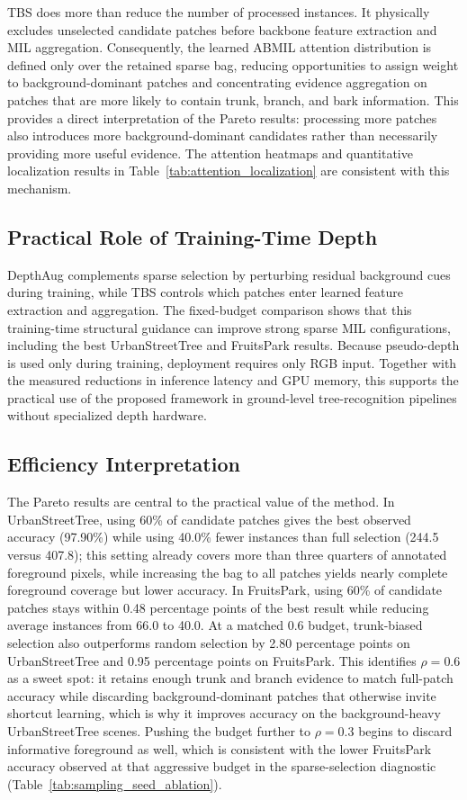 \documentclass{ieeeaccess}
\begin{document}
TBS does more than reduce the number of processed instances. It physically excludes unselected
candidate patches before backbone feature extraction and MIL aggregation. Consequently, the learned
ABMIL attention distribution is defined only over the retained sparse bag, reducing opportunities
to assign weight to background-dominant patches and concentrating evidence aggregation on patches
that are more likely to contain trunk, branch, and bark information. This provides a direct
interpretation of the Pareto results: processing more patches also introduces more
background-dominant candidates rather than necessarily providing more useful evidence. The
attention heatmaps and quantitative localization results in
Table~\ref{tab:attention_localization} are consistent with this mechanism.

\subsection{Practical Role of Training-Time Depth}
DepthAug complements sparse selection by perturbing residual background cues during training, while
TBS controls which patches enter learned feature extraction and aggregation. The fixed-budget
comparison shows that this training-time structural guidance can improve strong sparse MIL
configurations, including the best UrbanStreetTree and FruitsPark results. Because pseudo-depth is
used only during training, deployment requires only RGB input. Together with the measured
reductions in inference latency and GPU memory, this supports the practical use of the proposed
framework in ground-level tree-recognition pipelines without specialized depth hardware.

\subsection{Efficiency Interpretation}
The Pareto results are central to the practical value of the method. In UrbanStreetTree, using 60\%
of candidate patches gives the best observed accuracy (97.90\%) while using 40.0\% fewer instances
than full selection (244.5 versus 407.8); this setting already covers more than three quarters of
annotated foreground pixels, while increasing the bag to all patches yields nearly complete
foreground coverage but lower accuracy. In FruitsPark, using 60\% of candidate patches stays within
0.48 percentage points of the best result while reducing average instances from 66.0 to 40.0. At a
matched 0.6 budget, trunk-biased selection also outperforms random selection by 2.80 percentage
points on UrbanStreetTree and 0.95 percentage points on FruitsPark. This identifies $\rho=0.6$ as a
sweet spot: it retains enough trunk and branch evidence to match full-patch accuracy while
discarding background-dominant patches that otherwise invite shortcut learning, which is why it
improves accuracy on the background-heavy UrbanStreetTree scenes. Pushing the budget further to
$\rho=0.3$ begins to discard informative foreground as well, which is consistent with the lower
FruitsPark accuracy observed at that aggressive budget in the sparse-selection diagnostic
(Table~\ref{tab:sampling_seed_ablation}).
\end{document}
